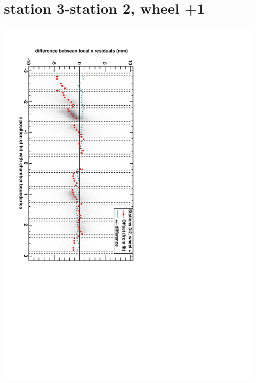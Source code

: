 \documentclass[compress]{beamer}
\begin{document}
\section*{station 3-station 2, wheel +1}
\begin{frame} \vfill \mbox{\hspace{-1 cm}\includegraphics[height=1.2\linewidth, angle=90]{DTrphidiff23VsPhi_whD_slope.pdf}} \end{frame}
\end{document}
